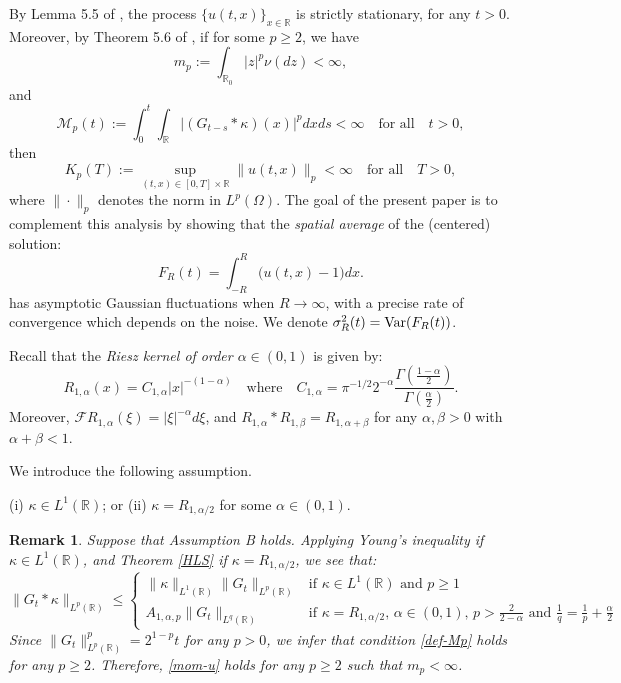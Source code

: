 \documentclass[12pt]{article}
\newtheorem{remark}[theorem]{Remark}
\def\cF{\mathcal{F}}
\def\cM{\mathcal{M}}
\def\bR{\mathbb{R}}
\def\k{\kappa}
\begin{document}
By Lemma 5.5 of \cite{BJ25}, the process $\{u(t,x)\}_{x\in \bR}$ is strictly stationary, for any $t>0$.
Moreover, by Theorem 5.6 of \cite{BJ25}, if for some $p\geq 2$, we have
\begin{equation}
\label{def-mp}
m_p:=\int_{\bR_0}|z|^p \nu(dz)<\infty,
\end{equation}
and
\begin{equation}
\label{def-Mp}
\cM_p(t):=\int_0^t \int_{\bR} \big|(G_{t-s}*\k)(x)\big|^p dx ds<\infty \quad \mbox{for all} \quad t>0,
\end{equation}
then
\begin{equation}
\label{mom-u}
K_p(T):=\sup_{(t,x)\in [0,T] \times \bR}\|u(t,x)\|_p<\infty \quad \mbox{for all} \quad T>0,
\end{equation}
where $\|\cdot\|_p$ denotes the norm in $L^p(\Omega)$. The goal of the present paper is to complement this analysis by showing that the {\em spatial average} of the (centered) solution:
\[
F_R(t)=\int_{-R}^{R}\big(u(t,x)-1 \big)dx.
\]
has asymptotic Gaussian fluctuations when $R \to \infty$, with a precise rate of convergence which depends on the noise.  We denote $\sigma_R^2(t)={\rm Var}(F_R(t))$. 




\medskip

\medskip

Recall that the {\em Riesz kernel of order $\alpha \in (0,1)$} is given by:
\[
R_{1,\alpha}(x)=C_{1,\alpha}|x|^{-(1-\alpha)} \quad \mbox{where} \quad C_{1,\alpha}=\pi^{-1/2}2^{-\alpha}\frac{\Gamma(\frac{1-\alpha}{2})}{\Gamma(\frac{\alpha}{2})}.
\]
Moreover, $\cF R_{1,\alpha}(\xi)=|\xi|^{-\alpha}d\xi$, and $R_{1,\alpha}*R_{1,\beta}=R_{1,\alpha+\beta}$ for any $\alpha,\beta>0$ with $\alpha+\beta<1$.

\medskip

We introduce the following assumption.

\medskip

(i) $\k\in L^1(\bR)$; or (ii) $\k=R_{1,\alpha/2}$ for some $\alpha \in (0,1)$.




\begin{remark}
\label{rem-M}
{\rm Suppose that Assumption B holds. Applying Young's inequality if $\k \in L^1(\bR)$, and Theorem \ref{HLS} if $\k=R_{1,\alpha/2}$, we see that:
\[
\|G_t* \k\|_{L^p(\bR)} \leq
\left\{
\begin{array}{ll} 
\|\k\|_{L^1(\bR)} \|G_t\|_{L^p(\bR)} & \mbox{if $\k \in L^1(\bR)$ and $p\geq 1$} \\
A_{1,\alpha,p}\|G_t\|_{L^q(\bR)} & \mbox{if $\k=R_{1,\alpha/2}$, $\alpha \in (0,1)$, $p>\frac{2}{2-\alpha}$ and $\frac{1}{q}=\frac{1}{p}+\frac{\alpha}{2}$}
\end{array} \right.
\]
Since $\|G_t\|_{L^p(\bR)}^p=2^{1-p}t$ for any $p>0$, we infer that condition \eqref{def-Mp} holds for any $p\geq 2$. Therefore, \eqref{mom-u} holds for any $p \geq 2$ such that $m_p<\infty$.
}
\end{remark}
\end{document}

